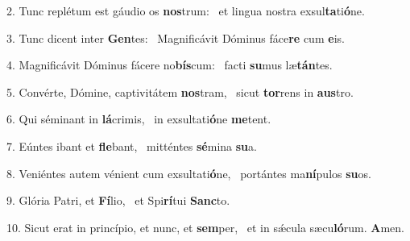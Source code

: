 2. Tunc replétum est gáudio os \textbf{nos}trum: \ast\  et lingua nostra exsul\textbf{ta}ti\textbf{ó}ne.\

3. Tunc dicent inter \textbf{Gen}tes: \ast\  Magnificávit Dóminus fáce\textbf{re} cum \textbf{e}is.\

4. Magnificávit Dóminus fácere no\textbf{bís}cum: \ast\  facti \textbf{su}mus læ\textbf{tán}tes.\

5. Convérte, Dómine, captivitátem \textbf{nos}tram, \ast\  sicut \textbf{tor}rens in \textbf{aus}tro.\

6. Qui séminant in \textbf{lá}crimis, \ast\  in exsultati\textbf{ó}ne \textbf{me}tent.\

7. Eúntes ibant et \textbf{fle}bant, \ast\  mitténtes \textbf{sé}mina \textbf{su}a.\

8. Veniéntes autem vénient cum exsultati\textbf{ó}ne, \ast\  portántes ma\textbf{ní}pulos \textbf{su}os.\

9. Glória Patri, et \textbf{Fí}lio, \ast\  et Spi\textbf{rí}tui \textbf{Sanc}to.\

10. Sicut erat in princípio, et nunc, et \textbf{sem}per, \ast\  et in sǽcula sæcu\textbf{ló}rum. \textbf{A}men.\

